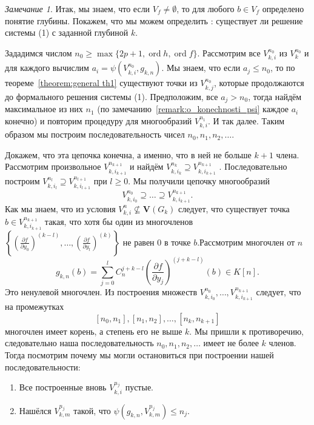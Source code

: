\documentclass[16pt]{article}
\DeclareMathOperator{\ord}{ord}
\renewcommand{\le}{\leqslant} %
\renewcommand{\ge}{\geqslant} %
\theoremstyle{plain1}
\theoremstyle{plain2}
\theoremstyle{plain}
\theoremstyle{plain3}
\theoremstyle{definition}
\theoremstyle{remark}
\newtheorem{remark}[theorem1]{Замечание}
\begin{document}
\begin{remark}\label{remark:o_syshestvovvanii reshenia c zadannoi glubinoi}
Итак, мы знаем, что если ${V}_f\neq\emptyset$, то для любого $b\in {V}_f$ определено понятие глубины. Покажем, что мы можем определить : существует ли решение системы (1) с заданной глубиной $k$.

Зададимся числом $n_0\ge\max\{ 2p+1,\ord{h},\ord{f}\}$. Рассмотрим все ${V}_{k,i}^{n_0}$ из $V_k^{n_0}$  и для каждого вычислим $a_i=\psi({V}_{k,i}^{n_0},g_{k,n})$. Мы знаем, что если $a_j\le n_0$, то по теореме~\ref{theorem:general th1} существуют точки из ${V}_{k,j}^{n_0}$, которые продолжаются до формального решения системы (1). Предположим, все $a_j>n_0$, тогда найдём максимальное из них $n_1$ (по замечанию~\ref{remark:o_konechnosti_psi} каждое $a_i$ конечно) и повторим процедуру для многообразий ${V}_{k,i}^{n_1}$. И так далее. Таким образом мы построим последовательность чисел $n_0,n_1,n_2,\ldots$.

Докажем, что эта цепочка конечна, а именно, что в ней не больше $k+1$ члена. Рассмотрим произвольное ${V}_{k,i_{k+1}}^{n_{k+1}}$  и найдём ${V}_{k,i_{k}}^{n_{k}}\supseteq {V}_{k,i_{k+1}}^{n_{k+1}}$ . Последовательно построим ${V}_{k,i_{l}}^{n_{l}}\supseteq {V}_{k,i_{l+1}}^{n_{l+1}}$ при $l\ge 0$. Мы получили цепочку многообразий
$$
{V}_{k,i_{0}}^{n_{0}}\supseteq\ldots\supseteq {V}_{k,i_{k+1}}^{n_{k+1}}.
$$
   Как мы знаем, что из условия ${V}_{k,i}^n \not\subseteq \mathbf{V}(G_k)$ следует, что существует точка $b\in {V}_{k,i_{k+1}}^{n_{k+1}}$ такая, что хотя бы один из многочленов $\left\{\left(\frac{\partial f}{\partial y_0}\right)^{(k-l)},\ldots, \left(\frac{\partial f}{\partial y_l}\right)^{(k)} \right\}$ не равен 0 в точке $b$.Рассмотрим многочлен от $n$
$$
g_{k,n}(b)=\sum\limits_{j=0}^{l}C_n^{j+k - l }\left(\frac{\partial f}{\partial y_j}\right)^{(j+k - l)}(b)\in K[n].
$$
Это ненулевой многочлен. Из построения множеств ${V}_{k,i_{0}}^{n_{0}},\ldots, {V}_{k,i_{k+1}}^{n_{k+1}}$ следует, что на промежутках $$[n_0,n_1],[n_1,n_2],\ldots,[n_k,n_{k+1}]$$
многочлен имеет корень, а степень его не выше $k$. Мы пришли к противоречию, следовательно наша последовательность  $n_0,n_1,n_2,\ldots$ имеет не более $k$ членов. Тогда посмотрим почему мы могли остановиться при построении нашей последовательности:

\begin{enumerate}
  \item Все построенные вновь ${V}_{k,i}^{n_j}$ пустые.
  \item Нашёлся ${V}_{k,m}^{n_j}$ такой, что $ \psi(g_{k,n},{V}_{k,m}^{n_j})\le n_j$.
\end{enumerate}


\end{remark}
\end{document}
